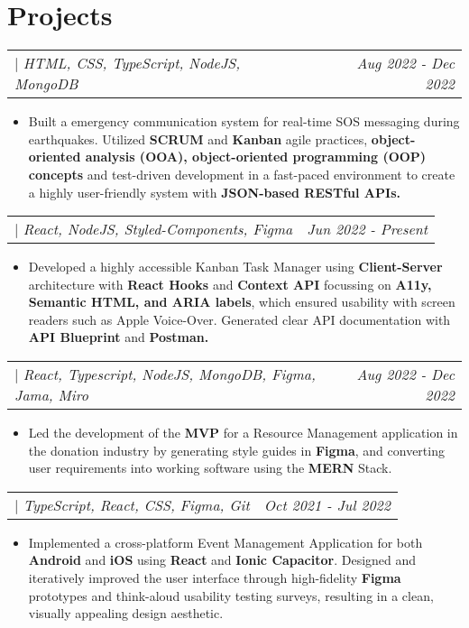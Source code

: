 \documentclass[letterpaper]{article}
\makeatletter
\newcommand{\resumeItemWithoutTitle}[1]{
  \item\small{
    {#1 \vspace{-2pt}}
  }
}
\newcommand{\shortSection}[1]{
    \vspace{-6pt}
    \section{#1}
}
\newcommand{\projectHeading}[3]{
  \begin{tabular*}{\textwidth}{l@{\extracolsep{\fill}}r}
        \textbf{#1} 
        \hspace{-2pt} $\vert$ \hspace{-2pt} \small{\textit{#2}} 
        & 
        \textit{#3} \\
    \end{tabular*}\vspace{-2pt}
}
\newcommand{\resumeItemListStart}{\begin{itemize}}
\newcommand{\resumeItemListEnd}{\end{itemize}}
\makeatother
\begin{document}



\shortSection{Projects}
\vspace{3pt}
\projectHeading {\href{https://esn.onrender.com}{\color{blue}{Emergency Social Network}}}{HTML, CSS, TypeScript, NodeJS, MongoDB}{Aug 2022 - Dec 2022}
\resumeItemListStart
\resumeItemWithoutTitle{Built a emergency communication system for real-time SOS messaging during earthquakes. Utilized \textbf{SCRUM} and \textbf{Kanban} agile practices, \textbf{object-oriented analysis (OOA), object-oriented programming (OOP) concepts} and test-driven development in a fast-paced environment to create a highly user-friendly system with \textbf{JSON-based RESTful APIs.}}
\resumeItemListEnd


\projectHeading {\href{https://kanbhan.netlify.app}{\color{blue}{Kanban Task Manager}}}{React, NodeJS, Styled-Components, Figma}{Jun 2022 - Present}
\resumeItemListStart
\resumeItemWithoutTitle{Developed a highly accessible Kanban Task Manager using \textbf{Client-Server} architecture with \textbf{React Hooks} and \textbf{Context API} focussing on \textbf{A11y, Semantic HTML, and ARIA labels}, which ensured usability with screen readers such as Apple Voice-Over. Generated clear API documentation with \textbf{API Blueprint} and \textbf{Postman.}}
\resumeItemListEnd


\vspace{3pt}
\projectHeading {\href{https://mailchi.mp/6cf20f3d592f/reuse}{\color{blue}{Re:use}}}{React, Typescript, NodeJS, MongoDB, Figma, Jama, Miro}{Aug 2022 - Dec 2022}
\resumeItemListStart
\resumeItemWithoutTitle{Led the development of the \textbf{MVP} for a Resource Management application in the donation industry by generating style guides in \textbf{Figma}, and converting user requirements into working software using the \textbf{MERN} Stack.}
\resumeItemListEnd

\vspace{3pt}
\projectHeading {\href{https://www.figma.com/file/FpWVddCZKdJz5V7ADe4eb5/Refriendo}{\color{blue}{Refriendo}}}{TypeScript, React, CSS, Figma, Git}{Oct 2021 - Jul 2022}
\resumeItemListStart
\resumeItemWithoutTitle{Implemented a cross-platform Event Management Application for both \textbf{Android} and \textbf{iOS} using \textbf{React} and \textbf{Ionic Capacitor}. Designed and iteratively improved the user interface through high-fidelity \textbf{Figma} prototypes and think-aloud usability testing surveys, resulting in a clean, visually appealing design aesthetic.}
\resumeItemListEnd
\end{document}

